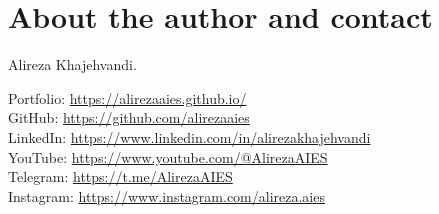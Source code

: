 \section*{About the author and contact}
Alireza Khajehvandi.

Portfolio: \url{https://alirezaaies.github.io/}\\

GitHub: \url{https://github.com/alirezaaies}\\

LinkedIn: \url{https://www.linkedin.com/in/alirezakhajehvandi}\\

YouTube: \url{https://www.youtube.com/@AlirezaAIES}\\

Telegram: \url{https://t.me/AlirezaAIES}\\

Instagram: \url{https://www.instagram.com/alireza.aies}\\
